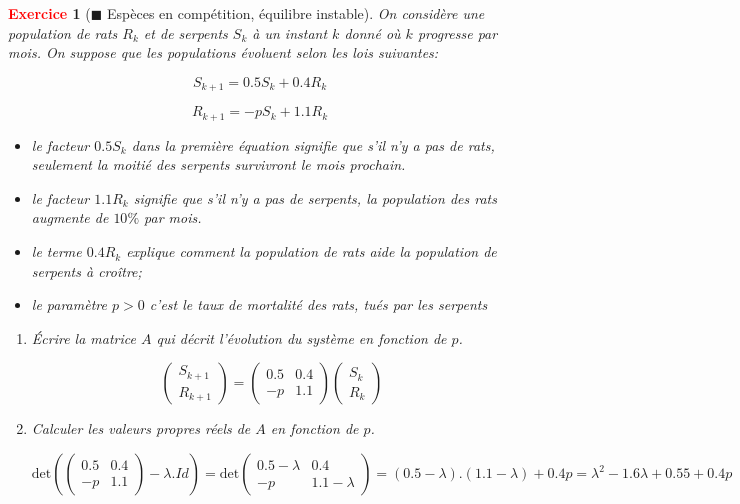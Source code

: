 \documentclass[11pt]{article}
\theoremstyle{mythmstyle}
\newtheorem{exo}{\textcolor{red}{\textbf{Exercice}}}
\begin{document}
 \medskip
 
\begin{exo}[$\blacksquare$ Espèces en compétition, équilibre instable]
On considère une population de rats $R_k$ et de serpents $S_k$ à un instant $k$ donné où $k$ progresse par mois. On suppose que les populations évoluent selon les lois suivantes:

$$
S_{k+1}= 0.5S_k + 0.4R_k
$$

$$
R_{k+1}= -p S_k+ 1.1R_k
$$

\begin{itemize}
\item le facteur $0.5 S_k$ dans la première équation signifie que s'il n'y a pas de rats, seulement la moitié des serpents survivront le mois prochain. 
\item le facteur $1.1R_k$ signifie que s'il n'y a pas de serpents, la population des rats augmente de $10\%$ par mois. 
\item le terme $0.4R_k$
explique comment la population de rats aide la population de serpents à croître;
\item le paramètre $p>0$ c'est le taux de mortalité des rats, tués par les serpents
\end{itemize}

\begin{enumerate}
    \item Écrire la matrice $A$ qui décrit l'évolution du système en fonction de $p$.
\begin{solution}
    $$
    \begin{pmatrix}S_{k+1}\\ R_{k+1}\end{pmatrix}=\begin{pmatrix}
    0.5& 0.4\\-p&1.1
    \end{pmatrix}\begin{pmatrix}
    S_k\\ R_k
    \end{pmatrix}
    $$
\end{solution}
    \item Calculer les valeurs propres réels de $A$ en fonction de $p$.
\begin{solution}
    $$\mathrm{det}(\begin{pmatrix}
    0.5& 0.4\\-p&1.1
    \end{pmatrix}-\lambda.Id)=\mathrm{det}\begin{pmatrix}
    0.5-\lambda& 0.4\\-p&1.1-\lambda
    \end{pmatrix}= (0.5-\lambda).(1.1-\lambda)+0.4p= \lambda^2 - 1.6 \lambda + 0.55 + 0.4p$$
    

\end{solution}
\end{enumerate}
\end{exo}
\end{document}
